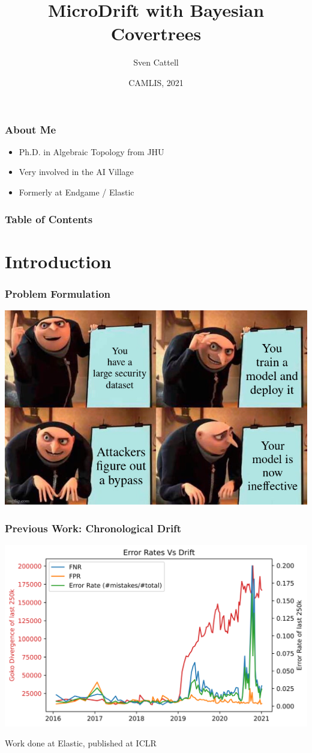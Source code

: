 \documentclass{beamer}
\title{MicroDrift with Bayesian Covertrees}
\author{Sven Cattell}
\date{CAMLIS, 2021}
\begin{document}
\frame{\titlepage}
\begin{frame}
\frametitle{About Me}
\begin{itemize}
\item Ph.D. in Algebraic Topology from JHU
\item Very involved in the AI Village
\item Formerly at Endgame / Elastic
\end{itemize}
\end{frame}

\begin{frame}
\frametitle{Table of Contents}
\tableofcontents
\end{frame}

\section{Introduction}

\begin{frame}
\frametitle{Problem Formulation}
\begin{center}
\includegraphics[scale=0.4]{grue_meme.jpg}
\end{center}
\end{frame}

\begin{frame}
\frametitle{Previous Work: Chronological Drift}
\begin{center}
\includegraphics[scale=0.6]{overall_vs_error.png}
\end{center}
Work done at Elastic, published at ICLR
\end{frame}
\end{document}
